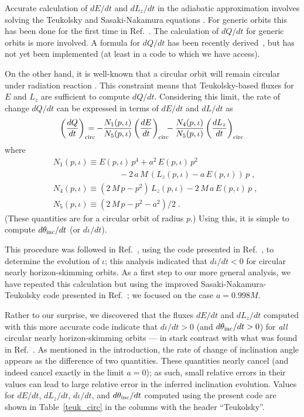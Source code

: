 \documentclass[aps,prd,twocolumn,showpacs,groupedaddress,nofootinbib]{revtex4}
\begin{document}
Accurate calculation of $dE/dt$ and $d{L}_z/dt$ in the adiabatic approximation involves solving the
Teukolsky and Sasaki-Nakamura equations {\cite{teukolsky,sasaknak}}.
For generic orbits this has been done for the first time in Ref.\
\cite{hughes_drasco}.  The calculation of $dQ/dt$ for generic orbits
is more involved.  A formula for $dQ/dt$ has been recently
derived~\cite{sago}, but has not yet been implemented (at least in a
code to which we have access).

On the other hand, it is well-known that a circular orbit will remain
circular under radiation reaction
{\cite{ryan_circ,kennefick_ori,mino_circ}}.  This constraint means
that Teukolsky-based fluxes for $E$ and $L_z$ are sufficient to
compute $dQ/dt$.  Considering this limit, the rate of change $dQ/dt$
can be expressed in terms of $dE/dt$ and $dL/dt$ as
\begin{equation}
\left(\frac{dQ}{dt}\right)_{\rm circ}\!\!\!\!\!\!\!=
-\frac{N_1(p,\iota)}{N_5(p,\iota)}\left(\frac{dE}{dt}\right)_{\rm circ}\!\!\!
-\frac{N_4(p,\iota)}{N_5(p,\iota)}\left(\frac{dL_z}{dt}\right)_{\rm
  circ}
\label{circ_relation}
\end{equation}
where 
\begin{align}
&N_{1}(p,\iota) \equiv
  E(p,\iota)\,p^{4}+a^{2}\,E(p,\iota)\,p^{2}\nonumber\\&
  \qquad\qquad\qquad\qquad-2\,a\,M\,(L_{z}(p,\iota)-a\,E(p,\iota))\,p\;,\label{N1}\\
&N_4(p,\iota) \equiv (2\,M\,p-p^2)\,L_z(p,\iota) - 2\,M\,a\,E(p,\iota)\,p\;,\label{N4}\\ 
& N_5 (p,\iota) \equiv (2\,M\,p-p^2-a^2)/2 \;.\label{N5}
\end{align}
(These quantities are for a circular orbit of radius $p$.)  Using
this, it is simple to compute $d \theta_{\rm inc}/dt$ (or
$d\iota/dt$).

This procedure was followed in Ref.~\cite{skimming}, using the code
presented in Ref.~\cite{first_code}, to determine the evolution of
$\iota$; this analysis indicated that $d\iota/dt<0$ for circular
nearly horizon-skimming orbits.  As a first step to our more general
analysis, we have repeated this calculation but using the improved
Sasaki-Nakamura-Teukolsky code presented in Ref.~\cite{hughes_drasco};
we focused on the case $a=0.998M$.

Rather to our surprise, we discovered that the fluxes $dE/dt$ and
$d{L}_z/dt$ computed with this more accurate code indicate that
$d\iota/dt>0$ (and $d\theta_{\rm inc}/dt>0$) for {\it all} circular
nearly horizon-skimming orbits --- in stark contrast with what was
found in Ref.~\cite{skimming}.  As mentioned in the introduction, the
rate of change of inclination angle appears as the difference of two
quantities.  These quantities nearly cancel (and indeed cancel exactly
in the limit $a = 0$); as such, small relative errors in their values
can lead to large relative error in the inferred inclination
evolution.  Values for $dE/dt$, $d{L}_z/dt$, $d\iota/dt$, and
$d\theta_{\rm inc}/dt$ computed using the present code are shown in
Table~\ref{teuk_circ} in the columns with the header ``Teukolsky''.
\end{document}
